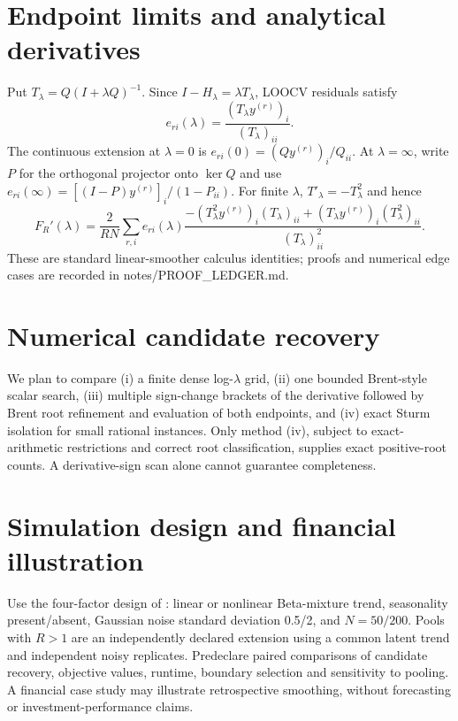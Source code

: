 \documentclass[11pt]{article}
\begin{document}
\section{Endpoint limits and analytical derivatives}
Put $T_\lambda=Q(I+\lambda Q)^{-1}$. Since
$I-H_\lambda=\lambda T_\lambda$, LOOCV residuals satisfy
\begin{equation}
 e_{ri}(\lambda)=\frac{(T_\lambda y^{(r)})_i}
 {(T_\lambda)_{ii}} .
\end{equation}
The continuous extension at $\lambda=0$ is
$e_{ri}(0)=(Qy^{(r)})_i/Q_{ii}$. At
$\lambda=\infty$, write $P$ for the orthogonal projector onto
$\ker Q$ and use
$e_{ri}(\infty)=[(I-P)y^{(r)}]_i/(1-P_{ii})$.
For finite $\lambda$, $T'_\lambda=-T_\lambda^2$ and hence
\begin{equation}
 F_R'(\lambda)=\frac{2}{RN}\sum_{r,i}e_{ri}(\lambda)
 \frac{-(T_\lambda^2y^{(r)})_i(T_\lambda)_{ii}
 +(T_\lambda y^{(r)})_i(T_\lambda^2)_{ii}}
 {(T_\lambda)_{ii}^2}.
\end{equation}
These are standard linear-smoother calculus identities; proofs
and numerical edge cases are recorded in notes/PROOF_LEDGER.md.

\section{Numerical candidate recovery}
We plan to compare (i) a finite dense log-$\lambda$ grid,
(ii) one bounded Brent-style scalar search,
(iii) multiple sign-change brackets of the derivative followed
by Brent root refinement and evaluation of both endpoints,
and (iv) exact Sturm isolation for small rational instances.
Only method (iv), subject to exact-arithmetic restrictions and
correct root classification, supplies exact positive-root counts.
A derivative-sign scan alone cannot guarantee completeness.

\section{Simulation design and financial illustration}
Use the four-factor design of \citet{cortes2017}:
linear or nonlinear Beta-mixture trend, seasonality present/absent,
Gaussian noise standard deviation 0.5/2, and $N=50/200$.
Pools with $R>1$ are an independently declared extension
using a common latent trend and independent noisy replicates.
Predeclare paired comparisons of candidate recovery, objective
values, runtime, boundary selection and sensitivity to pooling.
A financial case study may illustrate retrospective smoothing,
without forecasting or investment-performance claims.
\end{document}
